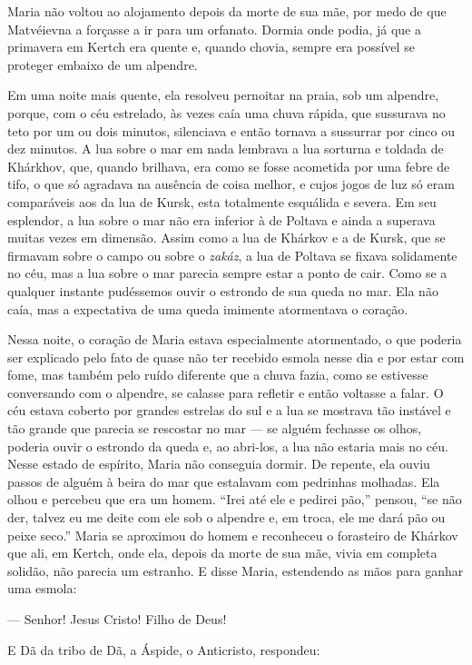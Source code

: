 Maria não voltou ao alojamento depois da morte de sua mãe, por medo de
que Matvéievna a forçasse a ir para um orfanato. Dormia onde podia, já
que a primavera em Kertch era quente e, quando chovia, sempre era
possível se proteger embaixo de um alpendre.

Em uma noite mais quente, ela resolveu pernoitar na praia, sob um
alpendre, porque, com o céu estrelado, às vezes caía uma chuva rápida,
que sussurava no teto por um ou dois minutos, silenciava e então tornava
a sussurrar por cinco ou dez minutos. A lua sobre o mar em nada lembrava
a lua sorturna e toldada de Khárkhov, que, quando brilhava, era como se
fosse acometida por uma febre de tifo, o que só agradava na ausência de
coisa melhor, e cujos jogos de luz só eram comparáveis aos da lua de
Kursk, esta totalmente esquálida e severa. Em seu esplendor, a lua sobre
o mar não era inferior à de Poltava e ainda a superava muitas vezes em
dimensão. Assim como a lua de Khárkov e a de Kursk, que se firmavam
sobre o campo ou sobre o \emph{zakáz}, a lua de Poltava se fixava
solidamente no céu, mas a lua sobre o mar parecia sempre estar a ponto
de cair. Como se a qualquer instante pudéssemos ouvir o estrondo de sua
queda no mar. Ela não caía, mas a expectativa de uma queda imimente
atormentava o coração.

Nessa noite, o coração de Maria estava especialmente atormentado, o que
poderia ser explicado pelo fato de quase não ter recebido esmola nesse
dia e por estar com fome, mas também pelo ruído diferente que a chuva
fazia, como se estivesse conversando com o alpendre, se calasse para
refletir e então voltasse a falar. O céu estava coberto por grandes
estrelas do sul e a lua se mostrava tão instável e tão grande que
parecia se rescostar no mar --- se alguém fechasse os olhos, poderia
ouvir o estrondo da queda e, ao abri-los, a lua não estaria mais no céu.
Nesse estado de espírito, Maria não conseguia dormir. De repente, ela
ouviu passos de alguém à beira do mar que estalavam com pedrinhas
molhadas. Ela olhou e percebeu que era um homem. ``Irei até ele e
pedirei pão,'' pensou, ``se não der, talvez eu me deite com ele sob o
alpendre e, em troca, ele me dará pão ou peixe seco.'' Maria se
aproximou do homem e reconheceu o forasteiro de Khárkov que ali, em
Kertch, onde ela, depois da morte de sua mãe, vivia em completa solidão,
não parecia um estranho. E disse Maria, estendendo as mãos para ganhar
uma esmola:

--- Senhor! Jesus Cristo! Filho de Deus!

E Dã da tribo de Dã, a Áspide, o Anticristo, respondeu:

